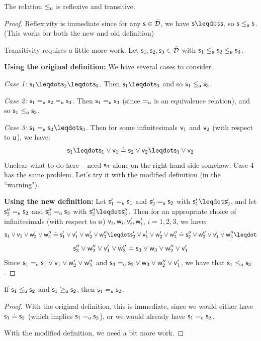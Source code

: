\documentclass[11pt]{article}
\begin{document}
\begin{prop}
The relation $\lequ$ is reflexive and transitive.  
\end{prop}
\begin{proof}
Reflexivity is immediate since for any $\stmt\in\tdomain$, we have $\stmt\finer\stmt$, so $\stmt\lequ\stmt$. (This works for both the new and old definition)

Transitivity requires a little more work. Let $\stmt_1,\stmt_2,\stmt_3\in\tdomain$ with $\stmt_1\lequ\stmt_2\lequ\stmt_3$. 

{\bf Using the original definition:}
We have several cases to consider. 

\emph{Case 1:} $\stmt_1\finer\stmt_2\finer\stmt_3$. Then $\stmt_1\finer\stmt_3$ and so $\stmt_1\lequ\stmt_3$. 

\emph{Case 2:} $\stmt_1\equ\stmt_2\equ\stmt_3$. Then $\stmt_1\equ\stmt_3$ (since $\equ$ is an equivalence relation), and so $\stmt_1\lequ\stmt_3$. 

\emph{Case 3:} $\stmt_1\equ\stmt_2\finer\stmt_3$. Then for some infinitesimals $\stmt[v]_1$ and $\stmt[v]_2$ (with respect to $\stmt[u]$), we have:
$$
\stmt_1\finer\stmt_1\OR\stmt[v]_1\eqgran\stmt_2\OR\stmt[v]_2\finer\stmt_3\OR\stmt[v]_2
$$
Unclear what to do here -- need $\stmt_3$ alone on the right-hand side somehow. Case 4 has the same problem. Let's try it with the modified definition (in the ``warning").

{\bf Using the new definition:}
Let $\stmt_1'\equ\stmt_1$ and $\stmt_2'\equ\stmt_2$ with $\stmt_1'\finer\stmt_2'$, and let $\stmt_2''\equ\stmt_2$ and $\stmt_3''\equ\stmt_3$ with $\stmt_2''\finer\stmt_3''$. 
Then for an appropriate choice of infinitesimals (with respect to $\stmt[u]$) $\stmt[v]_i,\stmt[w]_i,\stmt[v]_i',\stmt[w]_i'$, $i=1,2,3$, we have:
$$
\stmt_1\OR\stmt[v]_1\OR\stmt[w]_2'\OR\stmt[w]_3'' \eqgran \stmt_1'\OR\stmt[v]_1'\OR\stmt[w]_2'\OR\stmt[w]_3'' \finer \stmt_2'\OR\stmt[v]_1'\OR\stmt[w]_2'\OR\stmt[w]_3'' \eqgran \stmt_2''\OR\stmt[w]_2''\OR\stmt[v]_1'\OR\stmt[w]_3'' \finer
$$
$$
\stmt_3''\OR\stmt[w]_2''\OR\stmt[v]_1'\OR\stmt[w]_3'' \eqgran
\stmt_3\OR\stmt[w]_3 \OR\stmt[w]_2''\OR\stmt[v]_1'
$$
Since $\stmt_1 \equ \stmt_1\OR\stmt[v]_1\OR\stmt[w]_2'\OR\stmt[w]_3''$ and $\stmt_3 \equ \stmt_3\OR\stmt[w]_3 \OR\stmt[w]_2''\OR\stmt[v]_1' $, we have that $\stmt_1\lequ\stmt_3$. 

\end{proof}

\begin{prop}
If $\stmt_1\lequ\stmt_2$ and $\stmt_1\gequ \stmt_2$, then $\stmt_1\equ\stmt_2$.
\end{prop}
\begin{proof}
With the original definition, this is immediate, since we would either have $\stmt_1\eqgran\stmt_2$ (which implies $\stmt_1\equ\stmt_2$), or we would already have $\stmt_1\equ\stmt_2$.

With the modified definition, we need a bit more work. 
\end{proof}
\end{document}

